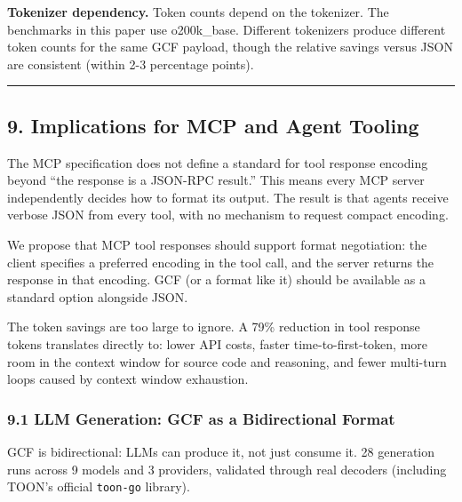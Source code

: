 \documentclass[
  11pt,
  paper=a4,
  ,captions=tableheading
]{scrartcl}
\begin{document}
\textbf{Tokenizer dependency.} Token counts depend on the tokenizer. The
benchmarks in this paper use o200k\_base. Different tokenizers produce
different token counts for the same GCF payload, though the relative
savings versus JSON are consistent (within 2-3 percentage points).

\begin{center}\rule{0.5\linewidth}{0.5pt}\end{center}

\subsection{9. Implications for MCP and Agent
Tooling}\label{implications-for-mcp-and-agent-tooling}

The MCP specification does not define a standard for tool response
encoding beyond ``the response is a JSON-RPC result.'' This means every
MCP server independently decides how to format its output. The result is
that agents receive verbose JSON from every tool, with no mechanism to
request compact encoding.

We propose that MCP tool responses should support format negotiation:
the client specifies a preferred encoding in the tool call, and the
server returns the response in that encoding. GCF (or a format like it)
should be available as a standard option alongside JSON.

The token savings are too large to ignore. A 79\% reduction in tool
response tokens translates directly to: lower API costs, faster
time-to-first-token, more room in the context window for source code and
reasoning, and fewer multi-turn loops caused by context window
exhaustion.

\subsubsection{9.1 LLM Generation: GCF as a Bidirectional
Format}\label{llm-generation-gcf-as-a-bidirectional-format}

GCF is bidirectional: LLMs can produce it, not just consume it. 28
generation runs across 9 models and 3 providers, validated through real
decoders (including TOON's official \texttt{toon-go} library).
\end{document}
